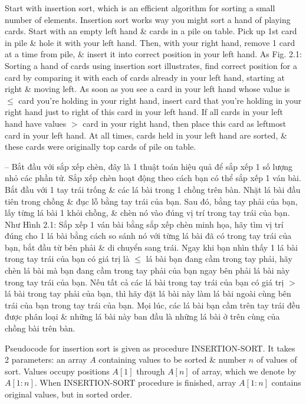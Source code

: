 \documentclass{article}
\begin{document}
\begin{itemize}
\begin{itemize}
\begin{itemize}
            Start with insertion sort, which is an efficient algorithm for sorting a small number of elements. Insertion sort works way you might sort a hand of playing cards. Start with an empty left hand \& cards in a pile on table. Pick up 1st card in pile \& hole it with your left hand. Then, with your right hand, remove 1 card at a time from pile, \& insert it into correct position in your left hand. As {\sf Fig. 2.1: Sorting a hand of cards using insertion sort} illustrates, find correct position for a card by comparing it with each of cards already in your left hand, starting at right \& moving left. As soon as you see a card in your left hand whose value is $\le$ card you're holding in your right hand, insert card that you're holding in your right hand just to right of this card in your left hand. If all cards in your left hand have values $>$ card in your right hand, then place this card as leftmost card in your left hand. At all times, cards held in your left hand are sorted, \& these cards were originally top cards of pile on table.
            
            -- Bắt đầu với sắp xếp chèn, đây là 1 thuật toán hiệu quả để sắp xếp 1 số lượng nhỏ các phần tử. Sắp xếp chèn hoạt động theo cách bạn có thể sắp xếp 1 ván bài. Bắt đầu với 1 tay trái trống \& các lá bài trong 1 chồng trên bàn. Nhặt lá bài đầu tiên trong chồng \& đục lỗ bằng tay trái của bạn. Sau đó, bằng tay phải của bạn, lấy từng lá bài 1 khỏi chồng, \& chèn nó vào đúng vị trí trong tay trái của bạn. Như {\sf Hình 2.1: Sắp xếp 1 ván bài bằng sắp xếp chèn} minh họa, hãy tìm vị trí đúng cho 1 lá bài bằng cách so sánh nó với từng lá bài đã có trong tay trái của bạn, bắt đầu từ bên phải \& di chuyển sang trái. Ngay khi bạn nhìn thấy 1 lá bài trong tay trái của bạn có giá trị là $\le$ lá bài bạn đang cầm trong tay phải, hãy chèn lá bài mà bạn đang cầm trong tay phải của bạn ngay bên phải lá bài này trong tay trái của bạn. Nếu tất cả các lá bài trong tay trái của bạn có giá trị $>$ lá bài trong tay phải của bạn, thì hãy đặt lá bài này làm lá bài ngoài cùng bên trái của bạn trong tay trái của bạn. Mọi lúc, các lá bài bạn cầm trên tay trái đều được phân loại \& những lá bài này ban đầu là những lá bài ở trên cùng của chồng bài trên bàn.
            
            Pseudocode for insertion sort is given as procedure INSERTION-SORT. It takes 2 parameters: an array $A$ containing values to be sorted \& number $n$ of values of sort. Values occupy positions $A[1]$ through $A[n]$ of array, which we denote by $A[1:n]$. When INSERTION-SORT procedure is finished, array $A[1:n]$ contains original values, but in sorted order.
            

\end{itemize}
\end{itemize}
\end{itemize}
\end{document}
